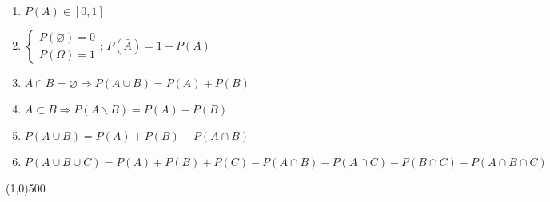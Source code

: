 \newpage
\begin{enumerate}
\item $P(A)\in [0,1]$
\item $\left\{\begin{array}{l} P(\varnothing)=0\\P(\Omega)=1 \end{array}\right.$; $ P(\bar{A})=1-P(A) $
\item $A\cap B=\varnothing \Rightarrow P(A\cup B)=P(A)+P(B)$
\item $A\subset B\Rightarrow P(A\backslash B)=P(A)-P(B)$
\item $P(A\cup B)=P(A)+P(B)-P(A\cap B)$
\item $P(A\cup B\cup C)=P(A)+P(B)+P(C)-P(A\cap B)-P(A\cap C)-P(B\cap C)+P(A\cap B\cap C)$
\end{enumerate}
\vfill\line(1,0){500}

